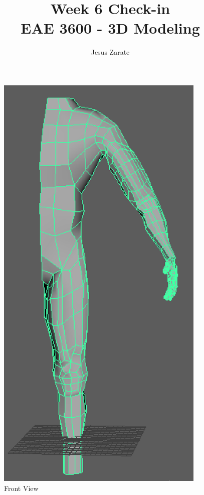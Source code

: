 \documentclass[a4paper]{article}
\title{
  Week 6 Check-in\\
  \large EAE 3600 - 3D Modeling}
\author{Jesus Zarate}
\begin{document}
\maketitle


\begin{figure}[h]
\centering
\includegraphics[width=10cm]{img/Front.png}
\caption{Front View}
\label{fig:Front View}
\end{figure}
\end{document}
